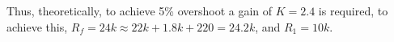 \documentclass[11pt,a4paper]{article}
\begin{document}
\begin{enumerate}
    Thus, theoretically, to achieve 5\% overshoot a gain of $K = 2.4$ is required, to achieve this, $R_f = 24k \approx 22k + 1.8k + 220 = 24.2k$, and $R_1 = 10k$. 
    
    
    

	
    
    
    

\end{enumerate}
\end{document}
